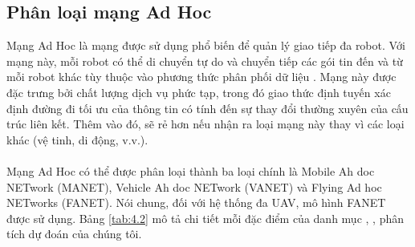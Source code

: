 \documentclass[11pt,openany]{book}
\begin{document}
\subsection{Phân loại mạng Ad Hoc}
Mạng Ad Hoc là mạng được sử dụng phổ biến để quản lý giao tiếp đa robot. Với mạng này, mỗi robot có thể di chuyển tự do và chuyển tiếp các gói tin đến và từ mỗi robot khác tùy thuộc vào phương thức phân phối dữ liệu \cite{bouachir2014conception}. Mạng này được đặc trưng bởi chất lượng dịch vụ phức tạp, trong đó giao thức định tuyến xác định đường đi tối ưu của thông tin có tính đến sự thay đổi thường xuyên của cấu trúc liên kết. Thêm vào đó, sẽ rẻ hơn nếu nhận ra loại mạng này thay vì các loại khác (vệ tinh, di động, v.v.).\\\\
Mạng Ad Hoc có thể được phân loại thành ba loại chính là Mobile Ah doc NETwork (MANET), Vehicle Ah doc NETwork (VANET) và Flying Ad hoc NETworks (FANET). Nói chung, đối với hệ thống đa UAV, mô hình FANET được sử dụng. Bảng \ref{tab:4.2} mô tả chi tiết mỗi đặc điểm của danh mục \cite{bekmezci2013flying}, \cite{maistrenko2016experimental}, phân tích dự đoán của chúng tôi.
\end{document}
